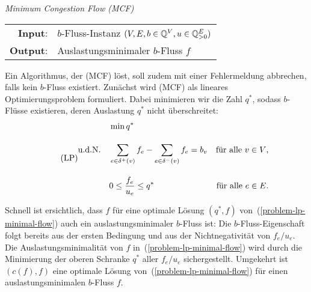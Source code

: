 \begin{center}
	\begin{mdframed}
		\centering
		\emph{Minimum Congestion Flow (MCF)} \\[1em]
		\begin{tabular}{rl}
			{\bfseries Input}: &$b$-Fluss-Instanz $(V, E, b\in\mathbb{Q}^V, u \in \mathbb{Q}^E_{>0})$\\
			{\bfseries Output}: &Auslastungsminimaler $b$-Fluss $f$
		\end{tabular}
	\end{mdframed}
\end{center}

Ein Algorithmus, der (MCF) löst, soll zudem mit einer Fehlermeldung abbrechen, falls kein $b$-Fluss existiert.
Zunächst wird (MCF) als lineares Optimierungsproblem formuliert.
Dabei minimieren wir die Zahl $q^*$, sodass $b$-Flüsse existieren, deren Auslastung $q^*$ nicht überschreitet:
\begin{equation}\tag{LP}\label{problem-lp-minimal-flow}
\begin{aligned}
& \min q^* \\[1em]
\text{u.d.N.\quad} & \sum_{e\in \delta^+(v)} f_e - \sum_{e\in\delta^-(v)} f_e = b_v & \text{für alle $v\in V$,} \\[1em]
& 0 \leq \frac{f_e}{u_e} \leq q^* & \text{für alle $e\in E$.}
\end{aligned}
\end{equation}

Schnell ist ersichtlich, dass $f$ für eine optimale Lösung $(q^*, f)$ von~(\ref{problem-lp-minimal-flow}) auch ein auslastungsminimaler $b$-Fluss ist: Die $b$-Fluss-Eigenschaft folgt bereits aus der ersten Bedingung und aus der Nichtnegativität von $f_e / u_e$.
Die Auslastungsminimalität von $f$ in~(\ref{problem-lp-minimal-flow}) wird durch die Minimierung der oberen Schranke $q^*$ aller $f_e / u_e$ sichergestellt.
Umgekehrt ist $(c(f), f)$ eine optimale Lösung von~(\ref{problem-lp-minimal-flow}) für einen auslastungsminimalen $b$-Fluss $f$.



